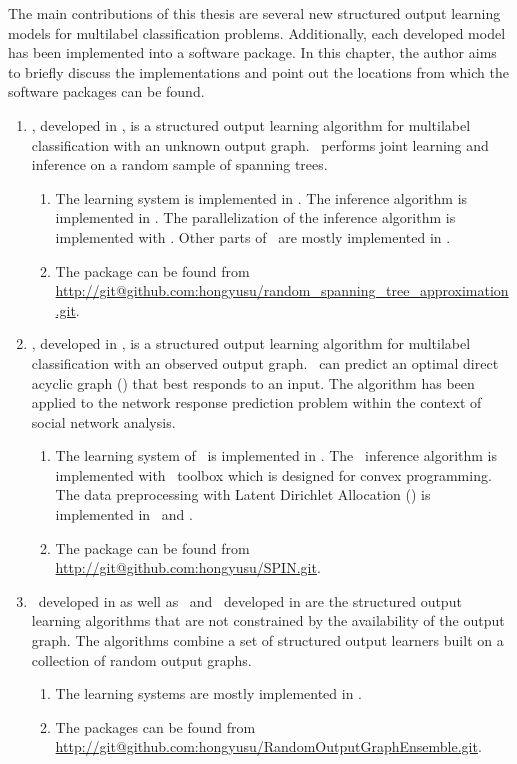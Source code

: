 {The main contributions of this thesis are several new structured output learning models for multilabel classification problems.
Additionally, each developed model has been implemented into a software package.
In this chapter, the author aims to briefly discuss the implementations and point out the locations from which the software packages can be found.

\begin{enumerate}
	\item \rta, developed in , is a structured output learning algorithm for multilabel classification with an unknown output graph. \rta\ performs joint learning and inference on a random sample of spanning trees.
	\begin{enumerate}
		\item The learning system is implemented in \matlab. The inference algorithm is implemented in \cpp. The parallelization of the inference algorithm is implemented with \openmp. Other parts of \rta\ are mostly implemented in \matlab.
		\item The package can be found from \url{http://git@github.com:hongyusu/random_spanning_tree_approximation.git}.
	\end{enumerate}
	
	\item \spin, developed in , is a structured output learning algorithm for multilabel classification with an observed output graph. \spin\ can predict an optimal direct acyclic graph (\daggraph) that best responds to an input. The algorithm has been applied to the network response prediction problem within the context of social network analysis.
	\begin{enumerate}
		\item The learning system of \spin\ is implemented in \matlab. The \sdp\ inference algorithm is implemented with \cvx\ toolbox which is designed for convex programming. The data preprocessing with Latent Dirichlet Allocation (\lda) \citep{Blei03latent} is implemented in \python\ and \matlab.
		\item The package can be found from \url{http://git@github.com:hongyusu/SPIN.git}.
	\end{enumerate}
	
	\item \mve\ developed in  as well as \amm\ and \mam\ developed in  are the structured output learning algorithms that are not constrained by the availability of the output graph. The algorithms combine a set of structured output learners built on a collection of random output graphs.
	\begin{enumerate}
		\item The learning systems are mostly implemented in \matlab.
		\item The packages can be found from \url{http://git@github.com:hongyusu/RandomOutputGraphEnsemble.git}.
	\end{enumerate}
\end{enumerate}




}
